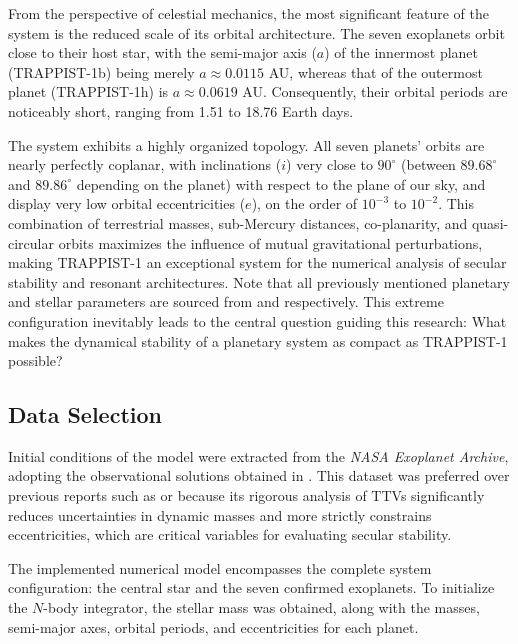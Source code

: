 \documentclass{aa}
\begin{document}
From the perspective of celestial mechanics, the most significant feature of the system is the reduced scale of its orbital architecture. The seven exoplanets orbit close to their host star, with the semi-major axis ($a$) of the innermost planet (TRAPPIST-1b) being merely $a \approx 0.0115$ AU, whereas that of the outermost planet (TRAPPIST-1h) is $a \approx 0.0619$ AU. Consequently, their orbital periods are noticeably short, ranging from 1.51 to 18.76 Earth days.

The system exhibits a highly organized topology. All seven planets' orbits are nearly perfectly coplanar, with inclinations ($i$) very close to $90^\circ$ (between $89.68^\circ$ and $89.86^\circ$ depending on the planet) with respect to the plane of our sky, and display very low orbital eccentricities ($e$), on the order of $10^{-3}$ to $10^{-2}$. This combination of terrestrial masses, sub-Mercury distances, co-planarity, and quasi-circular orbits maximizes the influence of mutual gravitational perturbations, making TRAPPIST-1 an exceptional system for the numerical analysis of secular stability and resonant architectures. Note that all previously mentioned planetary and stellar parameters are sourced from \citet{2021PSJ.....2....1A} and \citet{2025ApJ...989..181P} respectively. This extreme configuration inevitably leads to the central question guiding this research: What makes the dynamical stability of a planetary system as compact as TRAPPIST-1 possible?

\subsection{Data Selection}
Initial conditions of the model were extracted from the \textit{NASA Exoplanet Archive}, adopting the observational solutions obtained in \citet{2021PSJ.....2....1A}. This dataset was preferred over previous reports such as \citet{2017Natur.542..456G} or \citet{2018A&A...613A..68G} because its rigorous analysis of TTVs significantly reduces uncertainties in dynamic masses and more strictly constrains eccentricities, which are critical variables for evaluating secular stability.

The implemented numerical model encompasses the complete system configuration: the central star and the seven confirmed exoplanets. To initialize the $N$-body integrator, the stellar mass was obtained, along with the masses, semi-major axes, orbital periods, and eccentricities for each planet.

\end{document}
